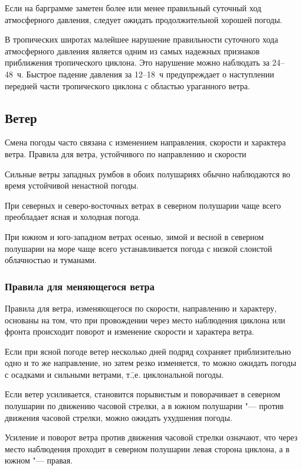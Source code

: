  Если на барграмме заметен более или менее правильный суточный
ход атмосферного давления, следует ожидать продолжительной хорошей
погоды.

 В тропических широтах малейшее нарушение правильности
суточного хода атмосферного давления является одним из самых надежных
признаков приближения тропического циклона. Это нарушение можно
наблюдать за 24--48~ч. Быстрое падение давления за 12--18~ч
предупреждает о наступлении передней части тропического циклона с
областью ураганного ветра.

\subsection{Ветер}

Смена погоды часто связана с изменением направления, скорости и
характера ветра.  Правила для ветра, устойчивого по направлению и
скорости

 Сильные ветры западных румбов в обоих полушариях обычно
наблюдаются во время устойчивой ненастной погоды.

 При северных и северо-восточных ветрах в северном полушарии
чаще всего преобладает ясная и холодная погода.

 При южном и юго-западном ветрах осенью, зимой и весной в северном
полушарии на море чаще всего устанавливается погода с низкой слоистой
облачностью и туманами.

\subsubsection{Правила для меняющегося ветра}

Правила для ветра, изменяющегося по скорости, направлению и характеру,
основаны на том, что при провождении через место наблюдения циклона
или фронта происходит поворот и изменение скорости и характера ветра.

 Если при ясной погоде ветер несколько дней подряд сохраняет
приблизительно одно и то же направление, но затем резко изменяется, то
можно ожидать погоды с осадками и сильными ветрами,
т.\=,е. циклональной погоды.

 Если ветер усиливается, становится порывистым и поворачивает в
северном полушарии по движению часовой стрелки, а в южном полушарии
"--- против движения часовой стрелки, можно ожидать ухудшения погоды.

 Усиление и поворот ветра против движения часовой стрелки
означают, что через место наблюдения проходит в северном полушарии
левая сторона циклона, а в южном "--- правая.

